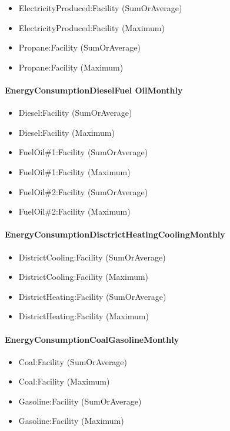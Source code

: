 \begin{itemize}
\item
  ElectricityProduced:Facility (SumOrAverage)
\item
  ElectricityProduced:Facility (Maximum)
\item
  Propane:Facility (SumOrAverage)
\item
  Propane:Facility (Maximum)
\end{itemize}

\paragraph{EnergyConsumptionDieselFuel OilMonthly}\label{energyconsumptiondieselfuel-oilmonthly}

\begin{itemize}
\item
  Diesel:Facility (SumOrAverage)
\item
  Diesel:Facility (Maximum)
\item
  FuelOil\#1:Facility (SumOrAverage)
\item
  FuelOil\#1:Facility (Maximum)
\item
  FuelOil\#2:Facility (SumOrAverage)
\item
  FuelOil\#2:Facility (Maximum)
\end{itemize}

\paragraph{EnergyConsumptionDisctrictHeatingCoolingMonthly}\label{energyconsumptiondisctrictheatingcoolingmonthly}

\begin{itemize}
\item
  DistrictCooling:Facility (SumOrAverage)
\item
  DistrictCooling:Facility (Maximum)
\item
  DistrictHeating:Facility (SumOrAverage)
\item
  DistrictHeating:Facility (Maximum)
\end{itemize}

\paragraph{EnergyConsumptionCoalGasolineMonthly}\label{energyconsumptioncoalgasolinemonthly}

\begin{itemize}
\item
  Coal:Facility (SumOrAverage)
\item
  Coal:Facility (Maximum)
\item
  Gasoline:Facility (SumOrAverage)
\item
  Gasoline:Facility (Maximum)
\end{itemize}

